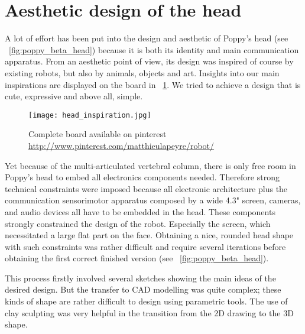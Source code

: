 
\section{ Aesthetic design of the head } %
\label{sec:head-design}
A lot of effort has been put into the design and aesthetic of Poppy's head (see \figurename~\ref{fig:poppy_beta_head}) because it is both its identity and main communication apparatus.
From an aesthetic point of view, its design was inspired of course by existing robots, but also by animals, objects and art. Insights into our  main inspirations are displayed on the board in \figurename~\ref{fig:head_inspiration}. We tried to achieve a design that is cute, expressive and above all, simple.

\begin{figure}[p]
    \begin{center}
        \texttt{[image: head\_inspiration.jpg]}
    \end{center}
    \caption{Complete board available on pinterest \url{http://www.pinterest.com/matthieulapeyre/robot/}}
    \label{fig:head_inspiration}
\end{figure}

Yet because of the multi-articulated vertebral column, there is only free room in Poppy’s head to embed all electronics components needed. Therefore strong technical constraints were imposed because all electronic architecture plus the communication sensorimotor apparatus composed by a wide 4.3" screen, cameras, and audio devices all have to be embedded in the head.
These components strongly constrained the design of the robot. Especially the screen, which necessitated a large flat part on the face. Obtaining a nice, rounded head shape with such constraints was rather difficult and require several iterations before obtaining the first correct finished version (see \figurename~\ref{fig:poppy_beta_head}).

This process firstly involved several sketches showing the main ideas of the desired design. But the transfer to CAD modelling was quite complex; these kinds of shape are rather difficult to design using parametric tools. The use of clay sculpting was very helpful  in the transition from the 2D drawing to the 3D shape.

